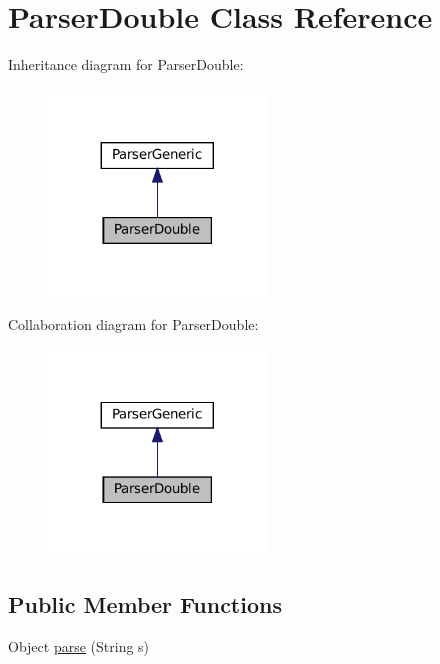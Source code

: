 \hypertarget{classParserDouble}{}\section{Parser\+Double Class Reference}
\label{classParserDouble}


Inheritance diagram for Parser\+Double\+:
\nopagebreak
\begin{figure}[H]
\begin{center}
\leavevmode
\includegraphics[width=164pt]{classParserDouble__inherit__graph}
\end{center}
\end{figure}


Collaboration diagram for Parser\+Double\+:
\nopagebreak
\begin{figure}[H]
\begin{center}
\leavevmode
\includegraphics[width=164pt]{classParserDouble__coll__graph}
\end{center}
\end{figure}
\subsection*{Public Member Functions}
\begin{DoxyCompactItemize}
\item 
Object \hyperlink{classParserDouble_a45d2180f6c110f27347c95c2d207b462}{parse} (String s)
\end{DoxyCompactItemize}


